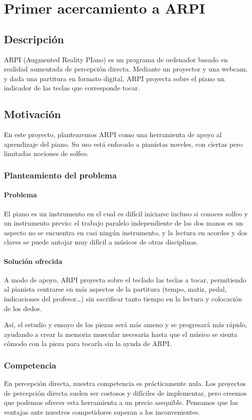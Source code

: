 \chapter{Primer acercamiento a ARPI}
\section{Descripción}
ARPI (Augmented Reality PIano) es un programa de ordenador basado en realidad aumentada de percepción
directa. Mediante un proyector y una webcam, y dada una partitura
en formato digital, ARPI proyecta sobre el piano un indicador de las
teclas que corresponde tocar.

\section{Motivación}
En este proyecto, plantearemos ARPI como una herramienta de apoyo al aprendizaje del piano. Su uso está
enfocado a pianistas noveles, con ciertas pero limitadas nociones de solfeo.

\subsection{Planteamiento del problema}
\subsubsection{Problema}
El piano es un instrumento en el cual es difícil iniciarse incluso
si conoces solfeo y un instrumento previo: el trabajo paralelo
independiente de las dos manos es un aspecto no se encuentra en
casi ningún instrumento, y la lectura en acordes y dos claves se
puede antojar muy difícil a músicos de otras disciplinas.

\subsubsection{Solución ofrecida}
A modo de apoyo, ARPI proyecta sobre el teclado las teclas
a tocar, permitiendo al pianista centrarse en más aspectos de la
partitura (tempo, matiz, pedal, indicaciones del profesor\ldots) sin sacrificar tanto
tiempo en la lectura y colocación de los dedos.

Así, el estudio y
ensayo de las piezas será más ameno y se progresará más rápido,
ayudando a crear la memoria muscular necesaria hasta que el músico
se sienta cómodo con la pieza para tocarla sin la ayuda de ARPI.

\subsection{Competencia}
En percepción directa, nuestra competencia es prácticamente nula. Los proyectos de
percepción directa suelen ser costosos y difíciles de implementar,
pero creemos que podemos ofrecer esta herramienta a un precio
asequible. Pensamos que las ventajas ante nuestros competidores superan a
los inconvenientes.

